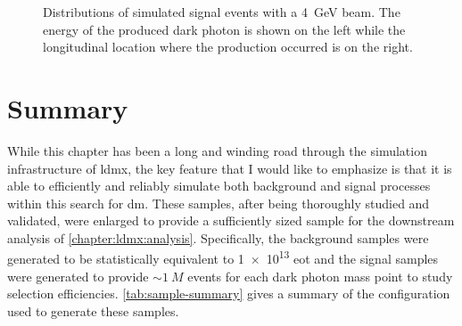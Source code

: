 \begin{figure}
\begin{subfigure}{0.48\textwidth}
  \end{subfigure}
  \caption{Distributions of simulated signal events with a \qty{4}{\giga\electronvolt} beam.
  The energy of the produced dark photon is shown on the left while the longitudinal
  location where the production occurred is on the right.}
  \label{fig:db-character-energy-and-z}
\end{figure}

\section{Summary}
While this chapter has been a long and winding road through the simulation infrastructure
of \ac{ldmx}, the key feature that I would like to emphasize is that it is able to
efficiently and reliably simulate both background and signal processes within this search for \ac{dm}.
These samples, after being thoroughly studied and validated, were enlarged to provide
a sufficiently sized sample for the downstream analysis of \cref{chapter:ldmx:analysis}.
Specifically, the background samples were generated to be statistically equivalent to
\num{1e13} \ac{eot} and the signal samples were generated to provide $\sim \qty{1}{M}$
events for each dark photon mass point to study selection efficiencies.
\cref{tab:sample-summary} gives a summary of the configuration used to generate these
samples.

\begin{table}
  \centering
  
  \caption{Configuration of the simulation samples used in this analysis.
  $E_\mathrm{beam}$ is the beam energy being studied ($4$ or $8$ GeV in this work).
  $m_A$ is the mass of the A' in MeV, $\epsilon$ is the dark brem mixing strength,
  $E_{\text{primary}}^{\text{ECal Front}}$ is the energy of the primary electron at the
  front of the ECal, $E_{A'}$ is the energy of the generated A',
  $E_{\text{tot nuc}}$ is the total energy transferred to nuclear interactions during the event,
  and $E_{\text{tot}~\mu}$ is the total energy of produced muons.}
  \label{tab:sample-summary}
\end{table}
